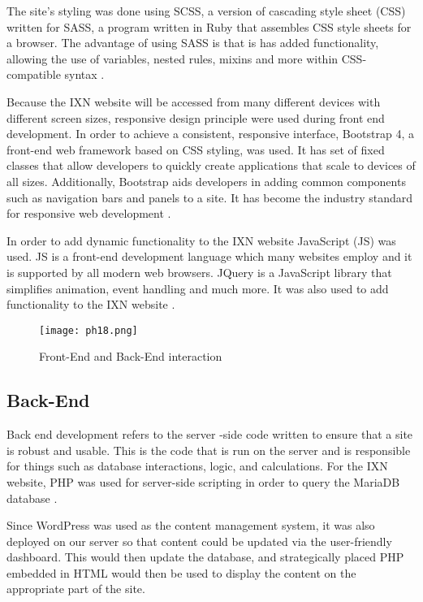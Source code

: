 The site's styling was done using SCSS, a version of cascading style
sheet (CSS) written for SASS, a program written in Ruby that assembles
CSS style sheets for a browser. The advantage of using SASS is that is
has added functionality, allowing the use of variables, nested rules,
mixins and more within CSS-compatible syntax \cite{p14} .

Because the IXN website will be accessed from many different devices
with different screen sizes, responsive design principle were used
during front end development. In order to achieve a consistent,
responsive interface, Bootstrap 4, a front-end web framework based on
CSS styling, was used. It has set of fixed classes that allow developers
to quickly create applications that scale to devices of all sizes.
Additionally, Bootstrap aids developers in adding common components such
as navigation bars and panels to a site. It has become the industry
standard for responsive web development \cite{p15} .

In order to add dynamic functionality to the IXN website JavaScript (JS)
was used. JS is a front-end development language which many websites
employ and it is supported by all modern web browsers. JQuery is a
JavaScript library that simplifies animation, event handling and much
more. It was also used to add functionality to the IXN website
\cite{p16}.

\begin{figure}[H]
      \centering
      \texttt{[image: ph18.png]}
      \caption{Front-End and Back-End interaction}
 \end{figure}

\hypertarget{back-end}{%
\subsection{Back-End}\label{back-end}}

Back end development refers to the server -side code written to ensure
that a site is robust and usable. This is the code that is run on the
server and is responsible for things such as database interactions,
logic, and calculations. For the IXN website, PHP was used for
server-side scripting in order to query the MariaDB database \cite{p17}
.

Since WordPress was used as the content management system, it was also
deployed on our server so that content could be updated via the
user-friendly dashboard. This would then update the database, and
strategically placed PHP embedded in HTML would then be used to display
the content on the appropriate part of the site.

